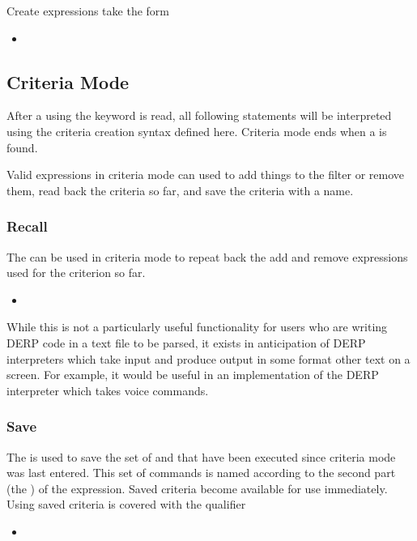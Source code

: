 Create expressions take the form
\begin{itemize}[leftmargin=2in]
    \item[\nonterminal{create\_expression}] \bnf{:}    \bnf{(} \bnf{|} \bnf{)}
\end{itemize}

\subsection{Criteria Mode}\label{Criteria_Mode}
After a  using the keyword  is read, all following statements will be interpreted using
the criteria creation syntax defined here. Criteria mode ends when a  is found.

Valid expressions in criteria mode can used to add things to the filter or remove them, read back the criteria so
far, and save the criteria with a name.

\subsubsection{Recall}
The  can be used in criteria mode to repeat back the add and remove expressions used for the
criterion so far.
\begin{itemize}[leftmargin=2in]
    \item[\nonterminal{recall\_expression}] \bnf{:} 
\end{itemize}

While this is not a particularly useful functionality for users who are writing DERP code in a text file to be
parsed, it exists in anticipation of DERP interpreters which take input and produce output in some format other
text on a screen. For example, it would be useful in an implementation of the DERP interpreter which takes voice
commands.


\subsubsection{Save}
The  is used to save the set of  and  that have been executed since
criteria mode was last entered. This set of commands is named according to the second part (the ) of the
expression. Saved criteria become available for use immediately. Using saved criteria is covered with the  qualifier
\begin{itemize}[leftmargin=2in]
    \item[\nonterminal{save\_expression}] \bnf{:}  
\end{itemize}

